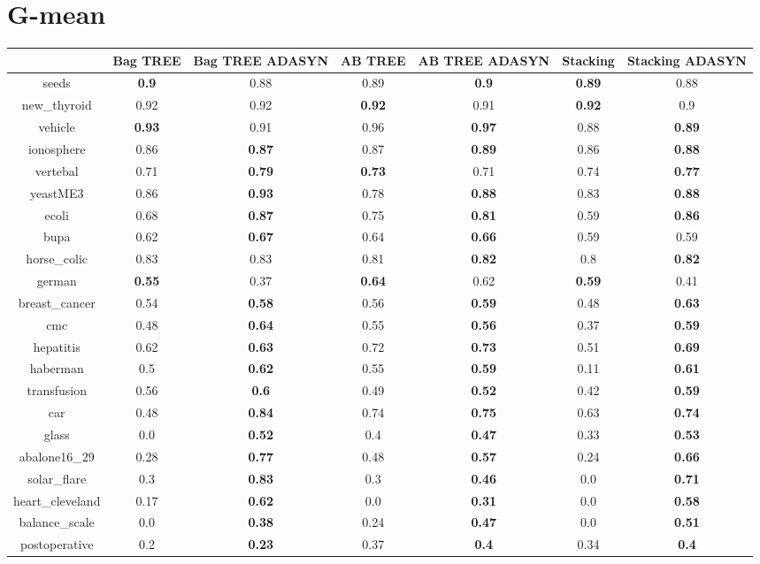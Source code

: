 \documentclass{article}%
\begin{document}
%
\section*{G{-}mean}%
\begin{tabular}{c|cccccc}%
&Bag TREE&Bag TREE ADASYN&AB TREE&AB TREE ADASYN&Stacking&Stacking ADASYN\\%
\hline%
seeds&\textbf{0.9}&0.88&0.89&\textbf{0.9}&\textbf{0.89}&0.88\\%
new\_thyroid&0.92&0.92&\textbf{0.92}&0.91&\textbf{0.92}&0.9\\%
vehicle&\textbf{0.93}&0.91&0.96&\textbf{0.97}&0.88&\textbf{0.89}\\%
ionosphere&0.86&\textbf{0.87}&0.87&\textbf{0.89}&0.86&\textbf{0.88}\\%
vertebal&0.71&\textbf{0.79}&\textbf{0.73}&0.71&0.74&\textbf{0.77}\\%
yeastME3&0.86&\textbf{0.93}&0.78&\textbf{0.88}&0.83&\textbf{0.88}\\%
ecoli&0.68&\textbf{0.87}&0.75&\textbf{0.81}&0.59&\textbf{0.86}\\%
bupa&0.62&\textbf{0.67}&0.64&\textbf{0.66}&0.59&0.59\\%
horse\_colic&0.83&0.83&0.81&\textbf{0.82}&0.8&\textbf{0.82}\\%
german&\textbf{0.55}&0.37&\textbf{0.64}&0.62&\textbf{0.59}&0.41\\%
breast\_cancer&0.54&\textbf{0.58}&0.56&\textbf{0.59}&0.48&\textbf{0.63}\\%
cmc&0.48&\textbf{0.64}&0.55&\textbf{0.56}&0.37&\textbf{0.59}\\%
hepatitis&0.62&\textbf{0.63}&0.72&\textbf{0.73}&0.51&\textbf{0.69}\\%
haberman&0.5&\textbf{0.62}&0.55&\textbf{0.59}&0.11&\textbf{0.61}\\%
transfusion&0.56&\textbf{0.6}&0.49&\textbf{0.52}&0.42&\textbf{0.59}\\%
car&0.48&\textbf{0.84}&0.74&\textbf{0.75}&0.63&\textbf{0.74}\\%
glass&0.0&\textbf{0.52}&0.4&\textbf{0.47}&0.33&\textbf{0.53}\\%
abalone16\_29&0.28&\textbf{0.77}&0.48&\textbf{0.57}&0.24&\textbf{0.66}\\%
solar\_flare&0.3&\textbf{0.83}&0.3&\textbf{0.46}&0.0&\textbf{0.71}\\%
heart\_cleveland&0.17&\textbf{0.62}&0.0&\textbf{0.31}&0.0&\textbf{0.58}\\%
balance\_scale&0.0&\textbf{0.38}&0.24&\textbf{0.47}&0.0&\textbf{0.51}\\%
postoperative&0.2&\textbf{0.23}&0.37&\textbf{0.4}&0.34&\textbf{0.4}\\%
\end{tabular}

%
\end{document}
